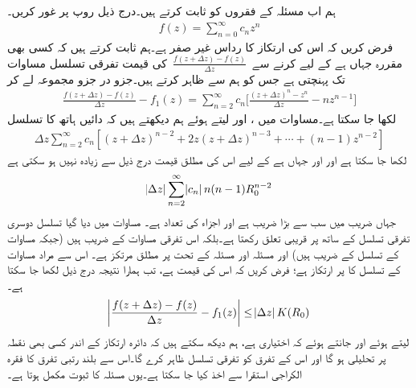ہم اب مسئلہ  کے فقروں کو ثابت کرتے ہیں۔درج ذیل روپ پر غور کریں۔
\begin{align*}
f(z)=\sum\limits_{n=0}^{\infty} c_n z^n
\end{align*}
فرض کریں کہ اس کی  ارتکاز کا رداس  غیر صفر ہے۔ہم ثابت کرتے ہیں کہ کسی بھی مقررہ  جہاں  ہے کے لیے  کرنے سے 
$\,\tfrac{f(z+\Delta z)-f(z)}{\Delta z}\,$
 کی قیمت تفرقی تسلسل مساوات  تک پہنچتی ہے جس کو ہم  سے ظاہر کرتے ہیں۔جزو در جزو مجموعہ لے کر
\begin{align*}
\frac{f(z+\Delta z)-f(z)}{\Delta z}-f_1(z)=\sum\limits_{n=2}^{\infty} c_n\big[\frac{(z+\Delta z)^n-z^n}{\Delta z}-nz^{n-1}\big]
\end{align*}
لکھا جا سکتا ہے۔مساوات  میں ،  اور  لیتے ہوئے ہم دیکھتے ہیں کہ دائیں ہاتھ کا تسلسل
\begin{align*}
\Delta z\sum\limits_{n=2}^{\infty} c_n[(z+\Delta z)^{n-2}+2z(z+\Delta z)^{n-3}+\cdots+(n-1)z^{n-2}]
\end{align*} 
لکھا جا سکتا ہے اور  اور  جہاں  ہے کے لیے اس کی مطلق قیمت درج ذیل سے زیادہ نہیں ہو سکتی ہے
\begin{align}\label{مساوات_ٹیلر_دوسری_تفرقی_تسلسل}
\abs{\Delta z}\sum\limits_{n=2}^{\infty} \abs{c_n} n(n-1)R_0^{n-2}
\end{align}
جہاں  ضریب   میں سب سے بڑا  ضریب   ہے اور  اجزاء کی تعداد  ہے۔ مساوات  میں دیا گیا تسلسل   دوسری تفرقی تسلسل کے ساتھ  پر  قریبی تعلق رکھتا ہے۔بلکہ اس تفرقی مساوات کے  ضریب   ہیں (جبکہ مساوات  کے تسلسل کے  ضریب   ہیں) اور مسئلہ  اور مسئلہ  کے تحت   پر مطلق مرتکز ہے۔ اس سے مراد مساوات  کے تسلسل کا  پر ارتکاز ہے؛ فرض کریں کہ اس کی قیمت  ہے، تب ہمارا نتیجہ درج  ذیل لکھا جا سکتا ہے۔
\begin{align*}
\abs{\frac{f(z+\Delta z)-f(z)}{\Delta z}-f_1(z)}\le \abs{\Delta z} K(R_0)
\end{align*}
 لیتے ہوئے اور جانتے ہوئے کہ  اختیاری ہے، ہم دیکھ سکتے ہیں کہ دائرہ ارتکاز کے اندر کسی بھی نقطہ پر  تحلیلی ہو گا اور اس کے تفرق کو تفرقی تسلسل ظاہر کرے گا۔اس سے بلند رتبی تفرق کا فقرہ الکراجی استقرا سے اخذ کیا جا سکتا ہے۔یوں  مسئلہ  کا ثبوت مکمل ہوتا ہے۔


